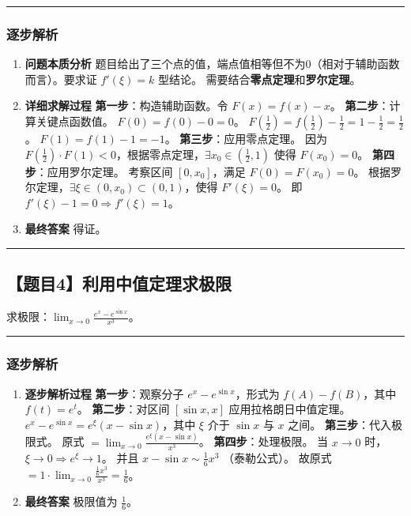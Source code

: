 \documentclass[UTF8]{ctexart}
\newenvironment{redenv}{\color{red}}{}
\newenvironment{detailedanalysis}{%
    \color{red}
    \begin{enumerate}[label=\textbf{第\arabic*步：}, leftmargin=*, align=left, itemsep=1.5ex]
}{%
    \end{enumerate}
}
\newcommand{\problemrule}{\noindent\rule{\textwidth}{1.5pt}\vspace{-0.8em}}
\newcommand{\analysisrule}{\noindent\rule{\textwidth}{0.8pt}\vspace{-0.8em}}
\begin{document}
\begin{redenv}
\analysisrule
\subsubsection*{逐步解析}

\begin{detailedanalysis}
\item \textbf{问题本质分析}
题目给出了三个点的值，端点值相等但不为0（相对于辅助函数而言）。要求证 $f'(\xi)=k$ 型结论。
需要结合\textbf{零点定理}和\textbf{罗尔定理}。

\item \textbf{详细求解过程}
\textbf{第一步}：构造辅助函数。令 $F(x) = f(x) - x$。
\textbf{第二步}：计算关键点函数值。
$F(0) = f(0) - 0 = 0$。
$F(\frac{1}{2}) = f(\frac{1}{2}) - \frac{1}{2} = 1 - \frac{1}{2} = \frac{1}{2}$。
$F(1) = f(1) - 1 = -1$。
\textbf{第三步}：应用零点定理。
因为 $F(\frac{1}{2}) \cdot F(1) < 0$，根据零点定理，$\exists x_0 \in (\frac{1}{2}, 1)$ 使得 $F(x_0)=0$。
\textbf{第四步}：应用罗尔定理。
考察区间 $[0, x_0]$，满足 $F(0) = F(x_0) = 0$。
根据罗尔定理，$\exists \xi \in (0, x_0) \subset (0, 1)$，使得 $F'(\xi) = 0$。
即 $f'(\xi) - 1 = 0 \Rightarrow f'(\xi) = 1$。

\item \textbf{最终答案}
得证。
\end{detailedanalysis}
\end{redenv}

\vspace{2em}
\problemrule
\subsection*{【题目4】利用中值定理求极限}
求极限：$\lim_{x \to 0} \frac{e^x - e^{\sin x}}{x^3}$。

\begin{redenv}
\analysisrule
\subsubsection*{逐步解析}

\begin{detailedanalysis}
\item \textbf{逐步解析过程}
\textbf{第一步}：观察分子 $e^x - e^{\sin x}$，形式为 $f(A) - f(B)$，其中 $f(t)=e^t$。
\textbf{第二步}：对区间 $[ \sin x, x ]$ 应用拉格朗日中值定理。
$e^x - e^{\sin x} = e^\xi (x - \sin x)$，其中 $\xi$ 介于 $\sin x$ 与 $x$ 之间。
\textbf{第三步}：代入极限式。
原式 $= \lim_{x \to 0} \frac{e^\xi (x - \sin x)}{x^3}$。
\textbf{第四步}：处理极限。
当 $x \to 0$ 时，$\xi \to 0 \Rightarrow e^\xi \to 1$。
并且 $x - \sin x \sim \frac{1}{6}x^3$ （泰勒公式）。
故原式 $= 1 \cdot \lim_{x \to 0} \frac{\frac{1}{6}x^3}{x^3} = \frac{1}{6}$。

\item \textbf{最终答案}
极限值为 $\frac{1}{6}$。
\end{detailedanalysis}
\end{redenv}
\end{document}
